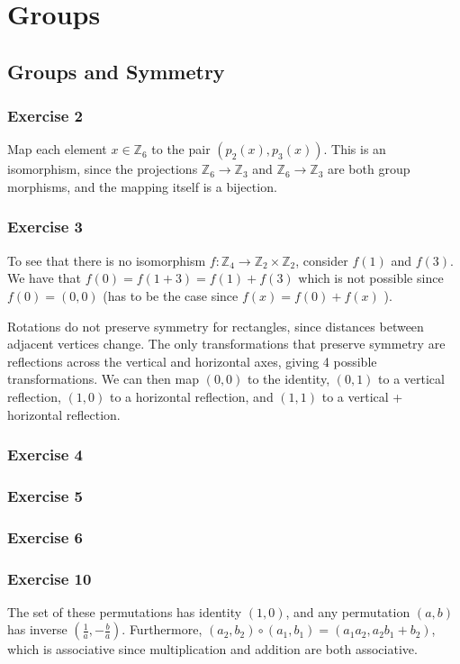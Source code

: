 \section{Groups}

\subsection{Groups and Symmetry}

\subsubsection{Exercise 2}
Map each element $x \in \mathbb{Z}_6$ to the pair $(p_2(x), p_3(x))$.
This is an isomorphism, since the projections $\mathbb{Z}_6 \to \mathbb{Z}_3$ 
and $\mathbb{Z}_6 \to \mathbb{Z}_3$ are both group morphisms, and the mapping
itself is a bijection.

\subsubsection{Exercise 3}
To see that there is no isomorphism $f: \mathbb{Z}_4 \to \mathbb{Z}_2 \times \mathbb{Z}_2$, 
consider $f(1)$ and $f(3)$. We have that $f(0) = f(1 + 3) = f(1) + f(3)$ which is not
possible since $f(0) = (0, 0)$ (has to be the case since $f(x) = f(0) + f(x)$ ).

Rotations do not preserve symmetry for rectangles, since distances between adjacent
vertices change. The only transformations that preserve symmetry are reflections
across the vertical and horizontal axes, giving 4 possible transformations. We can
then map $(0, 0)$ to the identity, $(0, 1)$ to a vertical reflection, $(1, 0)$ to
a horizontal reflection, and $(1, 1)$ to a vertical + horizontal reflection.

\subsubsection{Exercise 4}

\subsubsection{Exercise 5}

\subsubsection{Exercise 6}

\subsubsection{Exercise 10}
The set of these permutations has identity  $(1, 0)$, and any permutation $(a, b)$ has
inverse $(\frac{1}{a}, -\frac{b}{a})$. Furthermore, $(a_2, b_2) \circ (a_1, b_1) = (a_1 a_2, a_2 b_1 + b_2)$,
which is associative since multiplication and addition are both associative.


